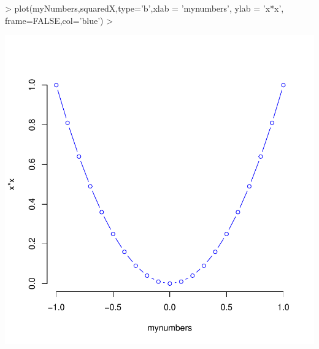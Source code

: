 \documentclass{article}
\begin{document}
\begin{Schunk}
\begin{Sinput}
> plot(myNumbers,squaredX,type='b',xlab = 'mynumbers', ylab = 'x*x', frame=FALSE,col='blue')
> 
\end{Sinput}
\end{Schunk}
\includegraphics{Lab01RinSweave-002}
\end{document}

